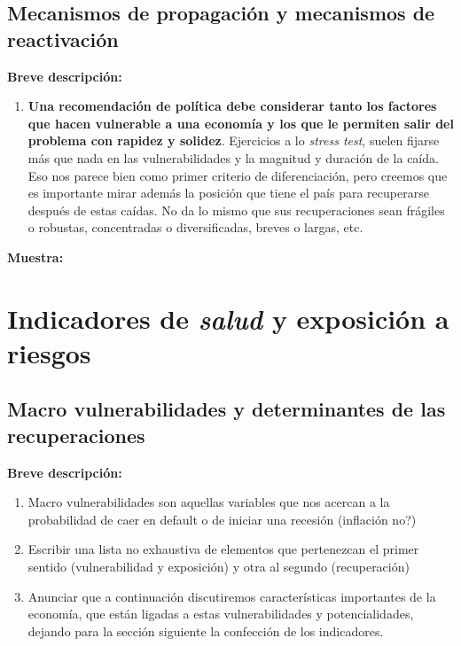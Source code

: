 \documentclass[12pt,a4paper]{article}
\begin{document}
\subsection{Mecanismos de propagación y mecanismos de reactivación}	

\textbf{Breve descripción:} \newline

\begin{enumerate}
	\item \textbf{Una recomendación de política debe considerar tanto los factores que hacen vulnerable a una economía y los que le permiten salir del problema con rapidez y solidez}. Ejercicios a lo \textit{stress test}, suelen fijarse más que nada en las vulnerabilidades y la magnitud y duración de la caída. Eso nos parece bien como primer criterio de diferenciación, pero creemos que es importante mirar además la posición que tiene el país para recuperarse después de estas caídas. No da lo mismo que sus recuperaciones sean frágiles o robustas, concentradas o diversificadas, breves o largas, etc.
\end{enumerate}


\textbf{Muestra:} \newline

\newpage	
\section{Indicadores de \textit{salud} y exposición a riesgos}
\subsection{Macro vulnerabilidades y determinantes de las recuperaciones}
\textbf{Breve descripción:} \newline

\begin{enumerate}
	\item Macro vulnerabilidades son aquellas variables que nos acercan a la probabilidad de caer en default o de iniciar una recesión (inflación no?) 
	\item Escribir una lista no exhaustiva de elementos que pertenezcan el primer sentido (vulnerabilidad y exposición) y otra al segundo (recuperación)
	\item Anunciar que a continuación discutiremos características importantes de la economía, que están ligadas a estas vulnerabilidades y potencialidades, dejando para la sección siguiente la confección de los indicadores. 	
\end{enumerate}
\end{document}
